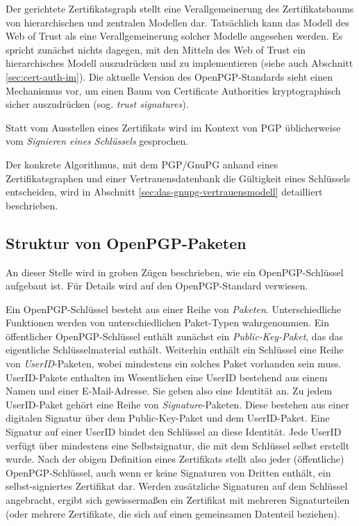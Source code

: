 Der gerichtete Zertifikatsgraph stellt eine Verallgemeinerung des
Zertifikatsbaums von hierarchischen und zentralen Modellen
dar. Tatsächlich kann das Modell des Web of Trust als eine
Verallgemeinerung solcher Modelle angesehen werden. Es spricht
zunächst nichts dagegen, mit den Mitteln des Web of Trust ein
hierarchisches Modell auszudrücken und zu implementieren (siehe auch
Abschnitt \ref{sec:cert-auth-im}). Die aktuelle Version des
OpenPGP-Standards sieht einen Mechanismus vor, um einen Baum von
Certificate Authorities kryptographisch sicher auszudrücken
(sog. \emph{trust signatures}).

Statt vom Ausstellen eines Zertifikats wird im Kontext von PGP
üblicherweise vom \emph{Signieren eines Schlüssels} gesprochen.

Der konkrete Algorithmus, mit dem PGP/GnuPG anhand eines
Zertifikatsgraphen und einer Vertrauensdatenbank die Gültigkeit
eines Schlüssels entscheiden, wird in Abschnitt
\ref{sec:das-gnupg-vertrauensmodell} detailliert beschrieben.

\subsection{Struktur von OpenPGP-Paketen}
\label{sec:structure-openpgp}
An dieser Stelle wird in groben Zügen beschrieben, wie ein
OpenPGP-Schlüssel aufgebaut ist. Für Details wird auf den
OpenPGP-Standard \cite{Callas2007} verwiesen.

Ein OpenPGP-Schlüssel besteht aus einer Reihe von
\emph{Paketen}. Unterschiedliche Funktionen werden von
unterschiedlichen Paket-Typen wahrgenommen. Ein öffentlicher
OpenPGP-Schlüssel enthält zunächst ein \emph{Public-Key-Paket},
das das eigentliche Schlüsselmaterial enthält. Weiterhin
enthält ein Schlüssel eine Reihe von \emph{UserID}-Paketen, wobei
mindestens ein solches Paket vorhanden sein muss. UserID-Pakete
enthalten im Wesentlichen eine UserID bestehend aus einem Namen und
einer E-Mail-Adresse. Sie geben also eine Identität an. Zu jedem
UserID-Paket gehört eine Reihe von \emph{Signature}-Paketen. Diese
bestehen aus einer digitalen Signatur über dem Public-Key-Paket und
dem UserID-Paket. Eine Signatur auf einer UserID bindet den
Schlüssel an diese Identität. Jede UserID verfügt über
mindestens eine Selbstsignatur, die mit dem Schlüssel selbst
erstellt wurde. Nach der obigen Definition eines Zertifikats stellt
also jeder (öffentliche) OpenPGP-Schlüssel, auch wenn er keine
Signaturen von Dritten enthält, ein selbst-signiertes Zertifikat
dar. Werden zusätzliche Signaturen auf dem Schlüssel angebracht,
ergibt sich gewissermaßen ein Zertifikat mit mehreren Signaturteilen
(oder mehrere Zertifikate, die sich auf einen gemeinsamen Datenteil
beziehen).

